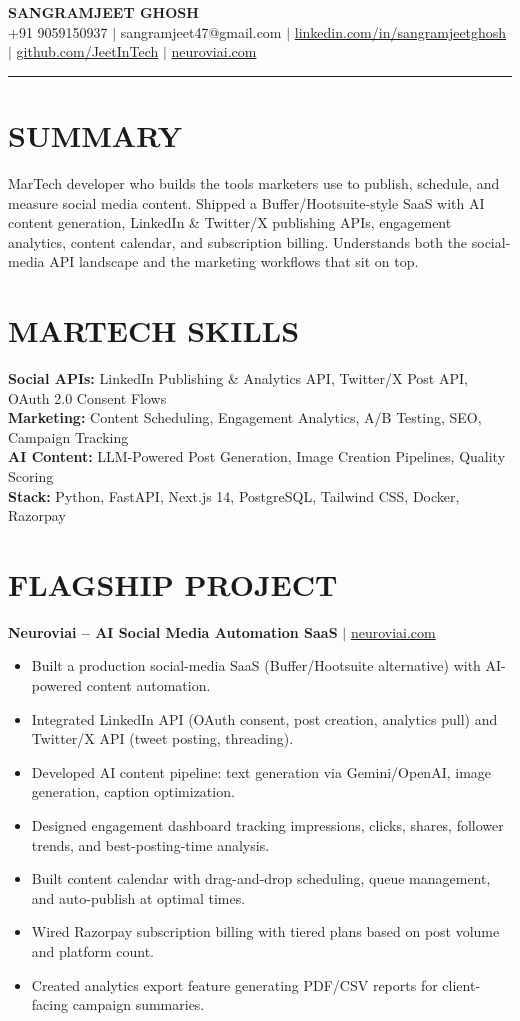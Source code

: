 \documentclass[10pt]{article}
\begin{document}
\begin{center}
{\Large \textbf{SANGRAMJEET GHOSH}} \\[2pt]
{\small +91 9059150937 $|$ sangramjeet47@gmail.com $|$
\href{https://www.linkedin.com/in/sangramjeetghosh}{linkedin.com/in/sangramjeetghosh} $|$
\href{https://github.com/JeetInTech}{github.com/JeetInTech} $|$
\href{https://neuroviai.com}{neuroviai.com}}
\end{center}

\noindent\rule{\textwidth}{0.4pt}

\section*{SUMMARY}
MarTech developer who builds the tools marketers use to publish, schedule, and measure social media content. Shipped a Buffer/Hootsuite-style SaaS with AI content generation, LinkedIn \& Twitter/X publishing APIs, engagement analytics, content calendar, and subscription billing. Understands both the social-media API landscape and the marketing workflows that sit on top.

\section*{MARTECH SKILLS}
\textbf{Social APIs:} LinkedIn Publishing \& Analytics API, Twitter/X Post API, OAuth 2.0 Consent Flows \\
\textbf{Marketing:} Content Scheduling, Engagement Analytics, A/B Testing, SEO, Campaign Tracking \\
\textbf{AI Content:} LLM-Powered Post Generation, Image Creation Pipelines, Quality Scoring \\
\textbf{Stack:} Python, FastAPI, Next.js 14, PostgreSQL, Tailwind CSS, Docker, Razorpay

\section*{FLAGSHIP PROJECT}
\textbf{Neuroviai -- AI Social Media Automation SaaS} $|$ \href{https://neuroviai.com}{neuroviai.com}
\begin{itemize}
\item Built a production social-media SaaS (Buffer/Hootsuite alternative) with AI-powered content automation.
\item Integrated LinkedIn API (OAuth consent, post creation, analytics pull) and Twitter/X API (tweet posting, threading).
\item Developed AI content pipeline: text generation via Gemini/OpenAI, image generation, caption optimization.
\item Designed engagement dashboard tracking impressions, clicks, shares, follower trends, and best-posting-time analysis.
\item Built content calendar with drag-and-drop scheduling, queue management, and auto-publish at optimal times.
\item Wired Razorpay subscription billing with tiered plans based on post volume and platform count.
\item Created analytics export feature generating PDF/CSV reports for client-facing campaign summaries.
\end{itemize}
\end{document}
